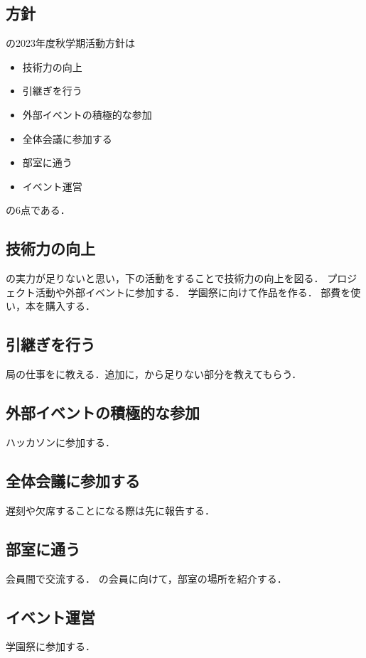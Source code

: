 \subsection*{\newGradeIfKouki{}\secondGrade{}方針}


\secondGrade{}の2023年度秋学期活動方針は
\begin{itemize}
    \item 技術力の向上
    \item 引継ぎを行う
    \item 外部イベントの積極的な参加
    \item 全体会議に参加する
    \item 部室に通う
    \item イベント運営
\end{itemize}
の6点である．

\subsection*{技術力の向上}
\secondGrade{}の実力が足りないと思い，下の活動をすることで技術力の向上を図る．
プロジェクト活動や外部イベントに参加する．
学園祭に向けて作品を作る．
部費を使い，本を購入する．

\subsection*{引継ぎを行う}
局の仕事を\firstGrade{}に教える．追加に，\thirdGrade{}から足りない部分を教えてもらう．

\subsection*{外部イベントの積極的な参加}
ハッカソンに参加する．

\subsection*{全体会議に参加する}
遅刻や欠席することになる際は先に報告する．

\subsection*{部室に通う}
会員間で交流する．
\firstGrade{}の会員に向けて，部室の場所を紹介する．

\subsection*{イベント運営}
学園祭に参加する．

